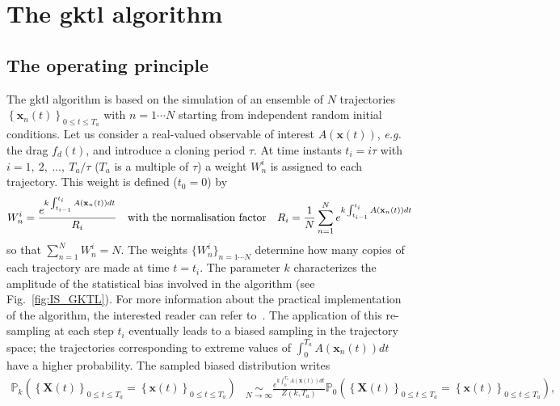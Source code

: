 \section{The \acl{gktl} algorithm}
\label{app:gktl_description}

\subsection{The operating principle}
\label{sec:gktl-operating-principle}

The \ac{gktl} algorithm is based on the simulation of an ensemble of $N$ trajectories $\left\{\mathbf{x}_{n}(t)\right\}_{0\leq t \leq T_a}$ with $ n =1 \cdots N$ starting from independent random initial conditions.
%
Let us consider a real-valued observable of interest $A(\mathbf{x}(t))$, {\emph{e.g.} the drag $f_d(t)$}, and introduce a cloning period $\tau$.
%
At time instants $t_{i}=i\tau$ with $i=1,~2,~...,~T_{a}/\tau$ ($T_{a}$ is a multiple of $\tau$) a weight $W_{n}^{i}$ is assigned to each trajectory. This weight is defined ($t_0=0$) by
%
\begin{equation}
W_{n}^{i}=\frac{e^{k\intop_{t_{i-1}}^{t_{i}}A(\mathbf{x}_{n}(t))dt}}{R_{i}}\quad \mbox{with the normalisation factor} \quad R_{i}=\frac{1}{N}\sum_{n=1}^{N}e^{k\int_{t_{i-1}}^{t_{i}}A(\mathbf{x}_{n}(t))dt}
\label{eq:Weight}
\end{equation}
so that $\sum_{n=1}^N W_n^i = N$.
%
%
{The weights $\{W_{n}^{i}\}_{n=1\cdots N}$ determine how many copies of each trajectory are made at time $t=t_i$. The parameter $k$ characterizes the amplitude of the statistical bias involved in the algorithm (see Fig.~\ref{fig:IS_GKTL}). For more information about the practical implementation of the algorithm, the interested reader can refer to~\citep{brewer2018efficient, lestang:tel-01974316}}.
The application of this re-sampling at each step $t_i$ eventually leads to a biased sampling in the trajectory space; the trajectories corresponding to extreme values of $\int_{0}^{T_a}A(\mathbf{x}_{n}(t))dt$ have a higher probability.
%
The sampled biased distribution writes
%
\begin{align}
\mathbb{P}_{k}\left(\left\{ \mathbf{X}(t)\right\} _{0\leq t\leq T_{a}}=\left\{ \mathbf{x}(t)\right\} _{0\leq t\leq T_{a}}\right) &\underset{N\rightarrow\infty}{\sim} \frac{e^{k\int_{0}^{T_{a}}A(\mathbf{x}(t))dt}}{Z(k,T_a)}\mathbb{\mathbb{P}}_{0}\left(\left\{ \mathbf{X}(t)\right\} _{0\leq t\leq T_{a}}=\left\{ \mathbf{x}(t)\right\} _{0\leq t\leq T_{a}}\right),
\label{eq:Biased_Path_Approximation}
\end{align}
